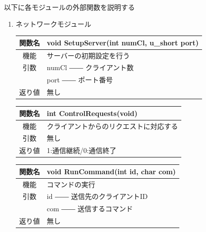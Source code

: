 \documentclass{jarticle}
\begin{document}
以下に各モジュールの外部関数を説明する
\begin{enumerate}
    \item ネットワークモジュール
    \begin{table}[h]
        \label{table:fanc_s1-1}
        \begin{center}
            \begin{tabular}{|c||p{30em}|}\hline
                関数名&void SetupServer(int numCl, u\_short port)\\\hline
                機能&サーバーの初期設定を行う\\
                引数&numCl ―― クライアント数\\
                &port ―― ポート番号\\
                返り値&無し\\\hline
            \end{tabular}
        \end{center}
    \end{table}
    \begin{table}[h]
        \label{table:fanc_s1-2}
        \begin{center}
            \begin{tabular}{|c||p{30em}|}\hline
                関数名&int ControlRequests(void) \\\hline
                機能&クライアントからのリクエストに対応する\\
                引数&無し\\
                返り値&1:通信継続/0:通信終了\\\hline
            \end{tabular}
        \end{center}
    \end{table}
    \begin{table}[h]
        \label{table:fanc_s1-3}
        \begin{center}
            \begin{tabular}{|c||p{30em}|}\hline
                関数名&void RunCommand(int id, char com) \\\hline
                機能&コマンドの実行\\
                引数&id ―― 送信先のクライアントID\\
                &com ―― 送信するコマンド\\
                返り値&無し\\\hline
            \end{tabular}
        \end{center}

\end{table}
\end{enumerate}
\end{document}
